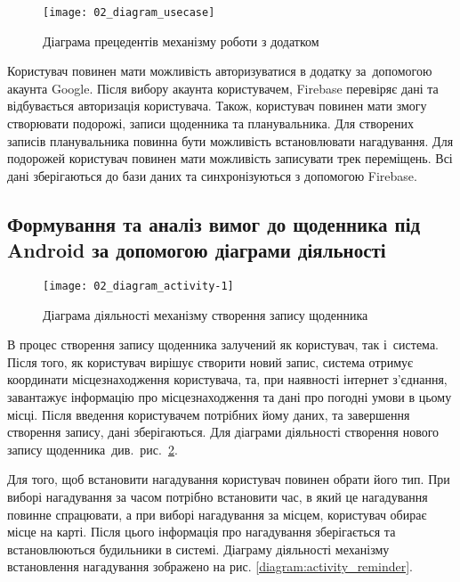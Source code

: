 \documentclass[../main.tex]{subfiles}
\begin{document}
\begin{figure}[H]
	\centering
	\texttt{[image: 02\_diagram\_usecase]}
	\caption{Діаграма прецедентів механізму роботи з додатком}
	\label{diagram:usecase}
\end{figure}

\newpage
Користувач повинен мати можливість авторизуватися в додатку за~допомогою акаунта Google. Після вибору акаунта користувачем, Firebase перевіряє дані та відбувається авторизація користувача. Також, користувач повинен мати змогу створювати подорожі, записи щоденника та планувальника. Для створених записів планувальника повинна бути можливість встановлювати нагадування. Для подорожей користувач повинен мати можливість записувати трек переміщень. Всі дані зберігаються до бази даних та синхронізуються з допомогою Firebase.


\subsection{Формування та аналіз вимог до щоденника  під Android за допомогою діаграми діяльності}

\begin{figure}[H]
	\centering
	\texttt{[image: 02\_diagram\_activity-1]}
	\caption{Діаграма діяльності механізму створення запису щоденника}
	\label{diagram:activity_diary}
\end{figure}

В процес створення запису щоденника залучений як користувач, так і~система. Після того, як користувач вирішує створити новий запис, система отримує координати місцезнаходження користувача, та, при наявності інтернет з'єднання, завантажує інформацію про місцезнаходження та дані про погодні умови в цьому місці. Після введення користувачем потрібних йому даних, та завершення створення запису, дані зберігаються. Для діаграми діяльності створення нового запису щоденника~див.~рис.~\ref{diagram:activity_diary}.

Для того, щоб встановити нагадування користувач повинен обрати його тип. При виборі нагадування за часом потрібно встановити час, в який це нагадування повинне спрацювати, а при виборі нагадування за місцем, користувач обирає місце на карті. Після цього інформація про нагадування зберігається та встановлюються будильники в системі. Діаграму діяльності механізму встановлення нагадування зображено на рис. \ref{diagram:activity_reminder}.
\end{document}
